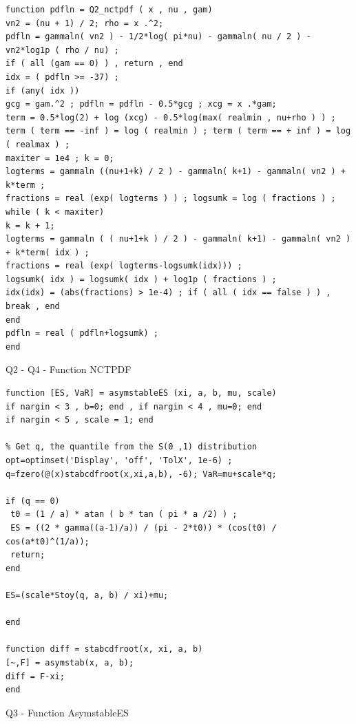 \documentclass[12pt]{article}
\begin{document}
\begin{Program}[!htb]
\begin{lstlisting}[style=Matlab-editor,basicstyle=\mlttfamily\footnotesize]
%Q2 & Q4 - Function: NCTPDF ------------------------------------------
function pdfln = Q2_nctpdf ( x , nu , gam)
vn2 = (nu + 1) / 2; rho = x .^2;
pdfln = gammaln( vn2 ) - 1/2*log( pi*nu) - gammaln( nu / 2 ) - vn2*log1p ( rho / nu) ;
if ( all (gam == 0) ) , return , end
idx = ( pdfln >= -37) ; 
if (any( idx ))
gcg = gam.^2 ; pdfln = pdfln - 0.5*gcg ; xcg = x .*gam;
term = 0.5*log(2) + log (xcg) - 0.5*log(max( realmin , nu+rho ) ) ;
term ( term == -inf ) = log ( realmin ) ; term ( term == + inf ) = log ( realmax ) ;
maxiter = 1e4 ; k = 0;
logterms = gammaln ((nu+1+k) / 2 ) - gammaln( k+1) - gammaln( vn2 ) + k*term ;
fractions = real (exp( logterms ) ) ; logsumk = log ( fractions ) ;
while ( k < maxiter)
k = k + 1;
logterms = gammaln ( ( nu+1+k ) / 2 ) - gammaln( k+1) - gammaln( vn2 ) + k*term( idx ) ;
fractions = real (exp( logterms-logsumk(idx))) ;
logsumk( idx ) = logsumk( idx ) + log1p ( fractions ) ;
idx(idx) = (abs(fractions) > 1e-4) ; if ( all ( idx == false ) ) , break , end
end
pdfln = real ( pdfln+logsumk) ;
end
\end{lstlisting}
\caption{Q2 - Q4 - Function NCTPDF}
\label{Q2 & Q4 - Function NCTPDF}
\end{Program}

\begin{Program}[!htb]
\begin{lstlisting}[style=Matlab-editor,basicstyle=\mlttfamily\footnotesize] 
%Q3 - Function: AsymstableES --------------------------------------------
function [ES, VaR] = asymstableES (xi, a, b, mu, scale)
if nargin < 3 , b=0; end , if nargin < 4 , mu=0; end
if nargin < 5 , scale = 1; end 

% Get q, the quantile from the S(0 ,1) distribution
opt=optimset('Display', 'off', 'TolX', 1e-6) ;
q=fzero(@(x)stabcdfroot(x,xi,a,b), -6); VaR=mu+scale*q;

if (q == 0)
 t0 = (1 / a) * atan ( b * tan ( pi * a /2) ) ;
 ES = ((2 * gamma((a-1)/a)) / (pi - 2*t0)) * (cos(t0) / cos(a*t0)^(1/a));
 return;
end

ES=(scale*Stoy(q, a, b) / xi)+mu;

end

function diff = stabcdfroot(x, xi, a, b)
[~,F] = asymstab(x, a, b);
diff = F-xi;
end
\end{lstlisting}
\caption{Q3 - Function AsymstableES}
\label{Q3 - Function AsymstableES}
\end{Program}
\end{document}
